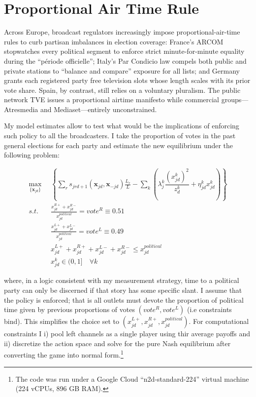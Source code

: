 \documentclass[12pt]{article}
\begin{document}
\FloatBarrier










\section{Proportional Air Time Rule}

\label{sec:counter}


Across Europe, broadcast regulators increasingly impose proportional-air-time rules to curb partisan imbalances in election coverage: France’s ARCOM stopwatches every political segment to enforce strict minute-for-minute equality during the “période officielle”; Italy’s Par Condicio law compels both public and private stations to “balance and compare” exposure for all lists; and Germany grants each registered party free television slots whose length scales with its prior vote share. Spain, by contrast, still relies on a voluntary pluralism. The public network TVE issues a proportional airtime manifesto while commercial groups—Atresmedia and Mediaset—entirely unconstrained. 

My model estimates allow to test what would be the implications of enforcing such policy to all the broadcasters.  I take the proportion of votes in the past general elections for each party and estimate the new equilibrium under the following problem: 



\begin{equation}\label{eq:payoffs2}
	\begin{aligned}
		\max_{\{\bm{x}_{jd}\}}   & \left\{   \sum_{r}s_{jrd+1}(\bm{x}_{jd}, \bm{x}_{-jd})\frac{L_r}{L} - \sum_k \left({\lambda_j^k}  \dfrac{(x_{jd}^k)^2}{z_{d}^k} + \eta_{jd}^k x_{jd}^k \right)  \right\}\\
		s.t.   \quad &   \frac{x_{jd}^{R+} + x_{jd}^{R-} }{x_{jd}^{political}}=vote^R\equiv0.51\\
		&  \frac{x_{jd}^{L+} + x_{jd}^{L-} }{x_{jd}^{political}}= vote^L\equiv0.49\\
       &  x_{jd}^{L+} +x_{jd}^{R+} + x_{jd}^{L-} + x_{jd}^{R-} \leq  x_{jd}^{political}\\
		& x_{jd}^k \in (0,1] \quad \forall k
	\end{aligned}
\end{equation} 


where, in a logic consistent with my measurement strategy, time to a political party can only be discerned if that story has some specific slant. I assume that the policy is enforced; that is all outlets must devote the proportion of political time given by previous proportions of votes $(vote^R, vote^L)$ (i.e constraints bind). This simplifies the choice set to $\left( x_{jd}^{L+} ,x_{jd}^{R+} ,x_{jd}^{political}\right)$. For computational constraints I i) pool left channels as a single player using thir average payoffs and ii) discretize the action space and solve for the pure Nash equilibrium after converting the game into normal form.\footnote{The code was run under a Google Cloud “n2d-standard-224” virtual machine (224 vCPUs, 896 GB RAM).}
\end{document}
